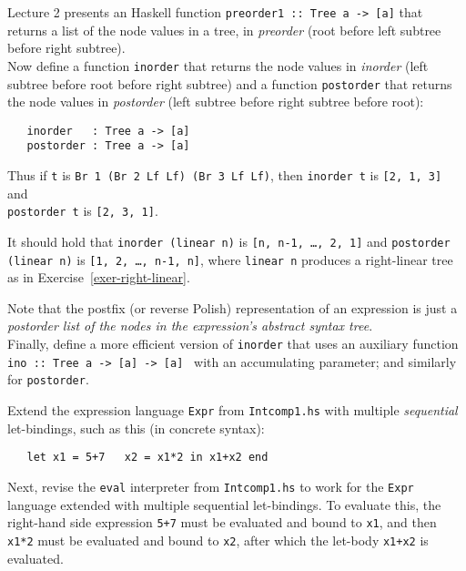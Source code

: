 \documentclass[a4paper]{article}
\begin{document}
\begin{exercise}\label{exer-tree-traversal} {\color{red}{This exercise isn't in the book (nor is the function preorder1), but I've translated the questions and the answers anyway.}}
  Lecture 2 presents an Haskell function \texttt{preorder1 ::\ Tree a ->
    [a]} that returns a list of the node values in a tree, in
  \emph{preorder} (root before left subtree before right subtree).\\
  
  Now define a function \texttt{inorder} that returns the node values
  in \emph{inorder} (left subtree before root before right subtree)
  and a function \texttt{postorder} that returns the node values in
  \emph{postorder} (left subtree before right subtree before root):

{\codesetup\begin{verbatim}
   inorder   : Tree a -> [a]
   postorder : Tree a -> [a]
\end{verbatim}}

\noindent 
Thus if \texttt{t} is \texttt{Br 1 (Br 2 Lf Lf) (Br 3 Lf Lf)},
then \texttt{inorder t} is \texttt{[2, 1, 3]} and\\ \texttt{postorder t}
is \texttt{[2, 3, 1]}.

It should hold that \texttt{inorder (linear n)} is \texttt{[n, n-1,
  \ldots, 2, 1]} and \texttt{postorder (linear n)} is \texttt{[1, 2,
  \ldots, n-1, n]}, where \texttt{linear n} produces a right-linear
  tree as in Exercise~\ref{exer-right-linear}.
  
  Note that the postfix (or reverse Polish) representation of an
  expression is just a \emph{postorder list of the nodes in the
    expression's abstract syntax tree}.\\
  
  Finally, define a more efficient version of \texttt{inorder} that
  uses an auxiliary function \texttt{ino ::\ Tree a -> [a] -> [a]
    } with an accumulating parameter; and similarly for
  \texttt{postorder}.  
\end{exercise}


\begin{exercise}\label{exer-multi-let-eval}
  Extend the expression language \texttt{Expr} from \texttt{Intcomp1.hs}
  with multiple \emph{sequential} let-bindings, such as this (in
  concrete syntax):

{\codesetup\begin{verbatim}
   let x1 = 5+7   x2 = x1*2 in x1+x2 end
\end{verbatim}}


\noindent 
Next, revise the \texttt{eval} interpreter from \texttt{Intcomp1.hs} to work
for the \texttt{Expr} language extended with multiple sequential
let-bindings. To evaluate this, the right-hand side expression \texttt{5+7} must be
evaluated and bound to \texttt{x1}, and then \texttt{x1*2} must be
evaluated and bound to \texttt{x2}, after which the let-body
\texttt{x1+x2} is evaluated.
\end{exercise}
\end{document}
